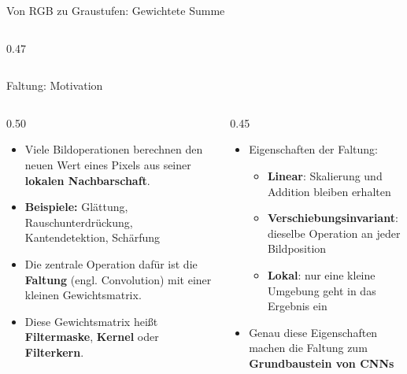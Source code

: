 {\begin{frame}{Von RGB zu Graustufen: Gewichtete Summe}
\begin{columns}[T]
\begin{column}{0.47\textwidth}
\end{column}

\end{columns}

\end{frame}


\begin{frame}{Faltung: Motivation}
\begin{columns}
\begin{column}{0.50\textwidth}
\begin{itemize}
    \item Viele Bildoperationen berechnen den neuen Wert eines Pixels aus seiner \textbf{lokalen Nachbarschaft}.
    \item \textbf{Beispiele:} Glättung, Rauschunterdrückung, Kantendetektion, Schärfung
    \item Die zentrale Operation dafür ist die \textbf{Faltung} (engl. Convolution) mit einer kleinen Gewichtsmatrix.
    \item Diese Gewichtsmatrix heißt \textbf{Filtermaske}, \textbf{Kernel} oder \textbf{Filterkern}.
\end{itemize}
\end{column}
\begin{column}{0.45\textwidth}
\begin{itemize}
    \item Eigenschaften der Faltung:
    \begin{itemize}
        \item \textbf{Linear}: Skalierung und Addition bleiben erhalten
        \item \textbf{Verschiebungsinvariant}: dieselbe Operation an jeder Bildposition
        \item \textbf{Lokal}: nur eine kleine Umgebung geht in das Ergebnis ein
    \end{itemize}
    \item Genau diese Eigenschaften machen die Faltung zum \textbf{Grundbaustein von CNNs}
\end{itemize}
\end{column}
\end{columns}
\end{frame}

}

